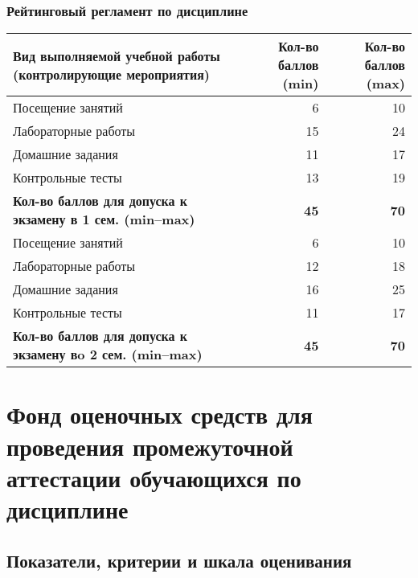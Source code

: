 \documentclass[a4paper,12pt]{article}
\begin{document}
\subsubsection*{Рейтинговый регламент по дисциплине}
\begin{longtable}{|>{\raggedright\arraybackslash}p{114mm}|r|r|}
\hline
\centering\arraybackslash Вид выполняемой учебной работы (контролирующие мероприятия) & 
\multicolumn{1}{p{19mm}|}{\centering\arraybackslash{}Кол-во баллов (min)} & 
\multicolumn{1}{p{19mm}|}{\centering\arraybackslash{}Кол-во баллов (max)} \\
\hline
Посещение занятий   & 6  & 10 \\ 
\hline
Лабораторные работы & 15 & 24 \\ 
\hline
Домашние задания    & 11 & 17 \\ 
\hline
Контрольные тесты   & 13 & 19 \\ 
\hline
\bf Кол-во баллов для допуска к экзамену в 1 сем. (min--max) & \bf 45 & \bf 70 \\ 
\hline
Посещение занятий   & 6  & 10 \\ 
\hline
Лабораторные работы & 12 & 18 \\ 
\hline
Домашние задания    & 16 & 25 \\ 
\hline
Контрольные тесты   & 11 & 17 \\ 
\hline
\bf Кол-во баллов для допуска к экзамену вo 2 сем. (min--max) & \bf 45 & \bf 70 \\ 

\hline
\end{longtable}

\section{Фонд оценочных средств для проведения промежуточной аттестации обучающихся по дисциплине}

\subsection{Показатели, критерии и шкала оценивания}
\end{document}
